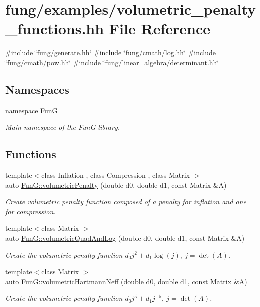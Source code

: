 \hypertarget{volumetric__penalty__functions_8hh}{\section{fung/examples/volumetric\-\_\-penalty\-\_\-functions.hh \-File \-Reference}
\label{volumetric__penalty__functions_8hh}
}
{\ttfamily \#include \char`\"{}fung/generate.\-hh\char`\"{}}\*
{\ttfamily \#include \char`\"{}fung/cmath/log.\-hh\char`\"{}}\*
{\ttfamily \#include \char`\"{}fung/cmath/pow.\-hh\char`\"{}}\*
{\ttfamily \#include \char`\"{}fung/linear\-\_\-algebra/determinant.\-hh\char`\"{}}\*
\subsection*{\-Namespaces}
\begin{DoxyCompactItemize}
\item 
namespace \hyperlink{namespaceFunG}{\-Fun\-G}
\begin{DoxyCompactList}\small\item\em \-Main namespace of the \-Fun\-G library. \end{DoxyCompactList}\end{DoxyCompactItemize}
\subsection*{\-Functions}
\begin{DoxyCompactItemize}
\item 
{\footnotesize template$<$class Inflation , class Compression , class Matrix $>$ }\\auto \hyperlink{namespaceFunG_ad26faeb264bb4b1cd7e70f3811c366c8}{\-Fun\-G\-::volumetric\-Penalty} (double d0, double d1, const \-Matrix \&\-A)
\begin{DoxyCompactList}\small\item\em \-Create volumetric penalty function composed of a penalty for inflation and one for compression. \end{DoxyCompactList}\item 
{\footnotesize template$<$class Matrix $>$ }\\auto \hyperlink{namespaceFunG_aaf30b9c36ed86e01b94f6b7c1d95cae8}{\-Fun\-G\-::volumetric\-Quad\-And\-Log} (double d0, double d1, const \-Matrix \&\-A)
\begin{DoxyCompactList}\small\item\em \-Create the volumetric penalty function $ d_0 j^2 + d_1 \log(j),\ j=\det(A) $. \end{DoxyCompactList}\item 
{\footnotesize template$<$class Matrix $>$ }\\auto \hyperlink{namespaceFunG_adf4be5df85ea9df10cc9e11c11aaeb7b}{\-Fun\-G\-::volumetric\-Hartmann\-Neff} (double d0, double d1, const \-Matrix \&\-A)
\begin{DoxyCompactList}\small\item\em \-Create the volumetric penalty function $ d_0 j^5 + d_1 j^{-5},\ j=\det(A) $. \end{DoxyCompactList}\end{DoxyCompactItemize}

